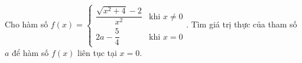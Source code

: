 \begin{ex}
Cho hàm số $f(x)=\begin{cases}\dfrac{\sqrt{x^2+4}-2}{x^2}&\text{khi }x\ne0\\2a-\dfrac54&\text{khi }x=0\end{cases}$. Tìm giá trị thực của tham số $a$ để hàm số $f(x)$ liên tục tại $x=0$.
\end{ex}
